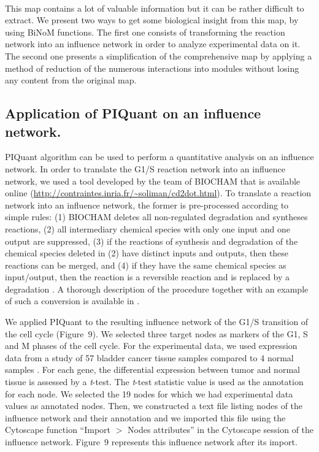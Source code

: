 \documentclass[11pt]{bmc_article_s50}
\newenvironment{bmcformat}{\begin{raggedright}\baselineskip20pt\sloppy\setboolean{publ}{false}}{\end{raggedright}\baselineskip20pt\sloppy}
\begin{document}
\begin{bmcformat}
\hrulefill\



This map contains a lot of valuable information but it can be rather difficult to extract. We present two
ways to get some biological insight from this map, by using BiNoM functions. The first one consists of
transforming the reaction network into an influence network in order to analyze
experimental data on it. The second one presents a simplification of the comprehensive map by
applying a method of reduction of the numerous interactions into modules without
losing any content from the original map.

\subsection*{Application of PIQuant on an influence network.}
PIQuant algorithm can be used to perform a quantitative analysis on an influence
network. In order to translate the G1/S reaction network into an influence network, we used
a tool developed by the team of BIOCHAM \cite{calzone2006biocham} that is
available online (\url{http://contraintes.inria.fr/~soliman/cd2dot.html}). To
translate a reaction network into an influence network, the former is
pre-processed according to simple rules: (1) BIOCHAM deletes all non-regulated
degradation and syntheses reactions, (2) all intermediary chemical species with
only one input and
one output are suppressed, (3) if the reactions of synthesis and degradation of
the chemical species deleted in (2) have distinct inputs and outputs, then these
reactions
can be merged, and (4) if they have the same chemical species as input/output,
then the reaction is a
reversible reaction and is replaced by a degradation \cite{fages2008frontiers}.
A thorough description of the procedure together with an example of such a
conversion is
available in \cite{calzone2011calamar}.

We applied PIQuant to the resulting influence network of the G1/S transition of
the cell cycle (Figure~9). We selected three target nodes as
markers of the G1, S and M
phases of the cell cycle. For the experimental data, we used expression data
from a study of 57 bladder cancer
tissue samples compared to 4 normal samples \cite{stransky2006regional}. For
each gene, the differential expression between tumor and normal tissue
is assessed by a \textit{t}-test. The \textit{t}-test statistic value is used as the annotation
for each node. We selected the 19 nodes for which we had experimental data
values as annotated nodes. Then, we constructed a text file listing nodes of the influence network
and their annotation and we imported this file using the Cytoscape function
``Import $>$ Nodes attributes''
in the Cytoscape session of the influence network.
Figure~9 represents this influence network after its import.


\end{bmcformat}
\end{document}
